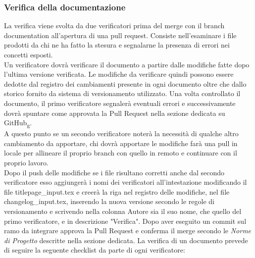 \subsubsection{Verifica della documentazione}
La verifica viene svolta da due verificatori prima del merge con il branch documentation all'apertura di una pull request.
Consiste nell'esaminare i file prodotti da chi ne ha fatto la stesura e segnalarne la presenza di errori nei concetti esposti.\\
Un verificatore dovrà verificare il documento a partire dalle modifiche fatte dopo l'ultima versione verificata.
Le modifiche da verificare quindi possono essere dedotte dal registro dei cambiamenti presente in ogni documento oltre che dallo storico fornito
da sistema di versionamento utilizzato.
Una volta controllato il documento, il primo verificatore segnalerà eventuali errori e
successivamente dovrà spuntare come approvata la Pull Request nella sezione dedicata su GitHub\textsubscript{g}. \\
A questo punto se un secondo verificatore noterà la necessità di qualche altro cambiamento da apportare, chi dovrà apportare le modifiche farà una pull in locale per
allineare il proprio branch con quello in remoto e continuare con il proprio lavoro.\\
Dopo il push delle modifiche se i file risultano corretti anche dal secondo verificatore esso aggiungerà i nomi dei verificatori all'intestazione modificando il file titlepage\_input.tex
 e creerà la riga nel registro delle modifiche, nel file changelog\_input.tex,  inserendo la nuova versione secondo le regole di versionamento e scrivendo nella colonna Autore sia il suo nome,
che quello del primo verificatore, e in descrizione "Verifica".
Dopo aver eseguito un commit sul ramo da integrare approva la Pull Request e conferma il merge secondo le \textit{Norme di Progetto} descritte nella sezione dedicata.
La verifica di un documento prevede di seguire la seguente checklist da parte di ogni verificatore:
